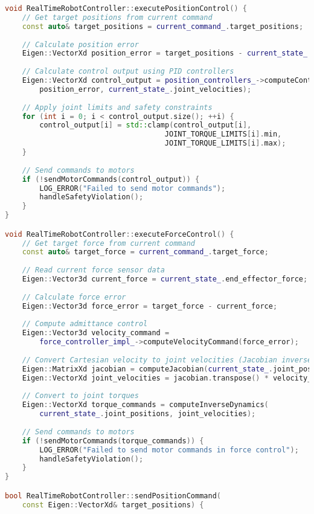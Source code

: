 \begin{lstlisting}[language=C++, caption={Real-Time Robot Controller}, label={lst:app-realtime-controller}]
void RealTimeRobotController::executePositionControl() {
    // Get target positions from current command
    const auto& target_positions = current_command_.target_positions;
    
    // Calculate position error
    Eigen::VectorXd position_error = target_positions - current_state_.joint_positions;
    
    // Calculate control output using PID controllers
    Eigen::VectorXd control_output = position_controllers_->computeControl(
        position_error, current_state_.joint_velocities);
    
    // Apply joint limits and safety constraints
    for (int i = 0; i < control_output.size(); ++i) {
        control_output[i] = std::clamp(control_output[i], 
                                     JOINT_TORQUE_LIMITS[i].min, 
                                     JOINT_TORQUE_LIMITS[i].max);
    }
    
    // Send commands to motors
    if (!sendMotorCommands(control_output)) {
        LOG_ERROR("Failed to send motor commands");
        handleSafetyViolation();
    }
}

void RealTimeRobotController::executeForceControl() {
    // Get target force from current command
    const auto& target_force = current_command_.target_force;
    
    // Read current force sensor data
    Eigen::Vector3d current_force = current_state_.end_effector_force;
    
    // Calculate force error
    Eigen::Vector3d force_error = target_force - current_force;
    
    // Compute admittance control
    Eigen::Vector3d velocity_command = 
        force_controller_impl_->computeVelocityCommand(force_error);
    
    // Convert Cartesian velocity to joint velocities (Jacobian inverse)
    Eigen::MatrixXd jacobian = computeJacobian(current_state_.joint_positions);
    Eigen::VectorXd joint_velocities = jacobian.transpose() * velocity_command;
    
    // Convert to joint torques
    Eigen::VectorXd torque_commands = computeInverseDynamics(
        current_state_.joint_positions, joint_velocities);
    
    // Send commands to motors
    if (!sendMotorCommands(torque_commands)) {
        LOG_ERROR("Failed to send motor commands in force control");
        handleSafetyViolation();
    }
}

bool RealTimeRobotController::sendPositionCommand(
    const Eigen::VectorXd& target_positions) {
    

\end{lstlisting}
